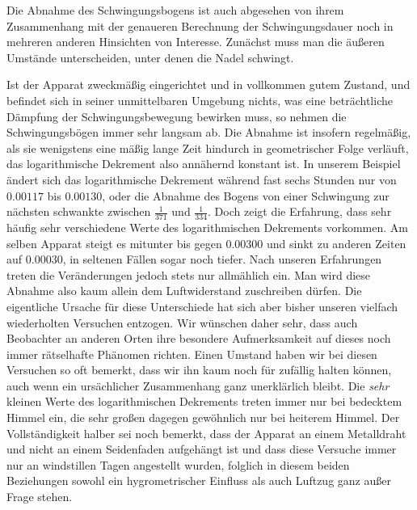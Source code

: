 Die Abnahme des Schwingungsbogens ist auch abgesehen von ihrem Zusammenhang mit der genaueren Berechnung der Schwingungsdauer noch in mehreren anderen Hinsichten von Interesse. Zunächst muss man die äußeren Umstände unterscheiden, unter denen die Nadel schwingt.

Ist der Apparat zweckmäßig eingerichtet und in vollkommen gutem Zustand, und befindet sich in seiner unmittelbaren Umgebung nichts, was eine beträchtliche Dämpfung der Schwingungsbewegung bewirken muss, so nehmen die Schwingungsbögen immer sehr langsam ab. Die Abnahme ist insofern regelmäßig, als sie wenigstens eine mäßig lange Zeit hindurch in geometrischer Folge verläuft, das logarithmische Dekrement also annähernd konstant ist. In unserem Beispiel ändert sich das logarithmische Dekrement während fast sechs Stunden nur von $0.00117$ bis $0.00130$, oder die Abnahme des Bogens von einer Schwingung zur nächsten schwankte zwischen $\tfrac1{371}$ und $\tfrac1{334}$. Doch zeigt die Erfahrung, dass sehr häufig sehr verschiedene Werte des logarithmischen Dekrements vorkommen. Am selben Apparat steigt es mitunter bis gegen $0.00300$ und sinkt zu anderen Zeiten auf $0.00030$, in seltenen Fällen sogar noch tiefer. Nach unseren Erfahrungen treten die Veränderungen jedoch stets nur allmählich ein. Man wird diese Abnahme also kaum allein dem Luftwiderstand zuschreiben dürfen. Die eigentliche Ursache für diese Unterschiede hat sich aber bisher unseren vielfach wiederholten Versuchen entzogen. Wir wünschen daher sehr, dass auch Beobachter an anderen Orten ihre besondere Aufmerksamkeit auf dieses noch immer rätselhafte Phänomen richten. Einen Umstand haben wir bei diesen Versuchen so oft bemerkt, dass wir ihn kaum noch für zufällig halten können, auch wenn ein ursächlicher Zusammenhang ganz unerklärlich bleibt. Die \textit{sehr} kleinen Werte des logarithmischen Dekrements treten immer nur bei bedecktem Himmel ein, die sehr großen dagegen gewöhnlich nur bei heiterem Himmel. Der Vollständigkeit halber sei noch bemerkt, dass der Apparat an einem Metalldraht und nicht an einem Seidenfaden aufgehängt ist und dass diese Versuche immer nur an windstillen Tagen angestellt wurden, folglich in diesem beiden Beziehungen sowohl ein hygrometrischer Einfluss als auch Luftzug ganz außer Frage stehen.

